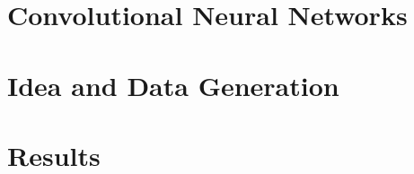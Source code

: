 \documentclass[11pt,table]{article}
\begin{document}
\section{Convolutional Neural Networks}


\section{Idea and Data Generation}


\section{Results}


\begin{footnotesize}







%	
%	
%	
%	


\end{footnotesize}


\end{document}
